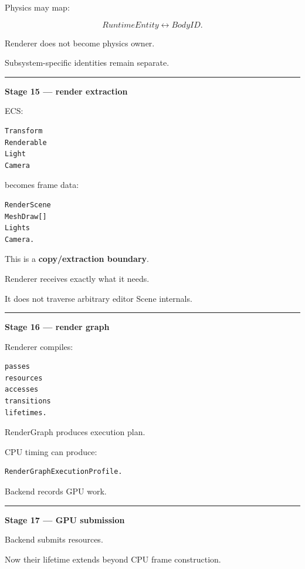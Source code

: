 Physics may map:

\[
RuntimeEntity
\leftrightarrow
BodyID.
\]

Renderer does not become physics owner.

Subsystem-specific identities remain separate.

\begin{center}\rule{0.5\linewidth}{0.5pt}\end{center}

\textbf{Stage 15 --- render extraction}

ECS:

\begin{verbatim}
Transform
Renderable
Light
Camera
\end{verbatim}

becomes frame data:

\begin{verbatim}
RenderScene
MeshDraw[]
Lights
Camera.
\end{verbatim}

This is a \textbf{copy/extraction boundary}.

Renderer receives exactly what it needs.

It does not traverse arbitrary editor Scene internals.

\begin{center}\rule{0.5\linewidth}{0.5pt}\end{center}

\textbf{Stage 16 --- render graph}

Renderer compiles:

\begin{verbatim}
passes
resources
accesses
transitions
lifetimes.
\end{verbatim}

RenderGraph produces execution plan.

CPU timing can produce:

\begin{verbatim}
RenderGraphExecutionProfile.
\end{verbatim}

Backend records GPU work.

\begin{center}\rule{0.5\linewidth}{0.5pt}\end{center}

\textbf{Stage 17 --- GPU submission}

Backend submits resources.

Now their lifetime extends beyond CPU frame construction.

